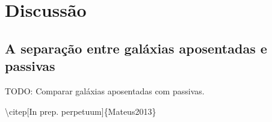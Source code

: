\section{Discussão}

\subsection{A separação entre galáxias aposentadas e passivas}

TODO: Comparar galáxias aposentadas com passivas.

\textbackslash{}citep{[In prep. perpetuum]}\{Mateus2013\}



